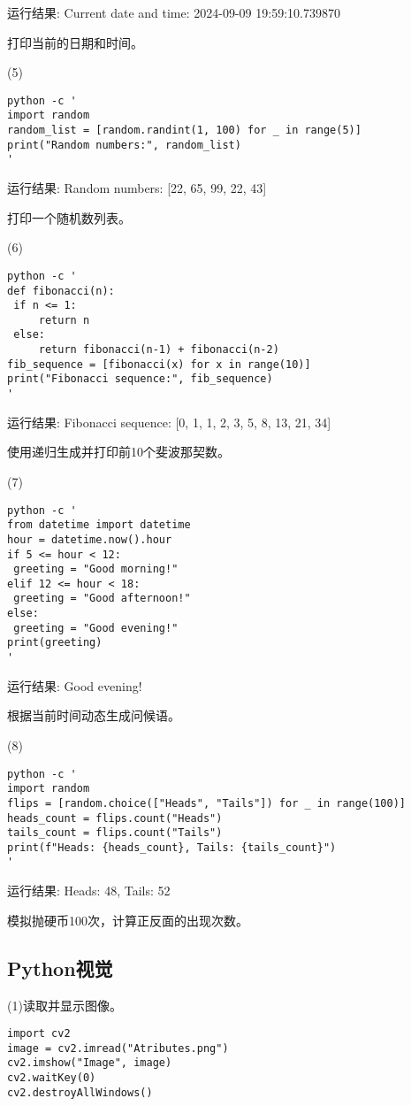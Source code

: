 \documentclass[a4paper, 12pt]{article}
\begin{document}
运行结果:
{\color{blue}
Current date and time: 2024-09-09 19:59:10.739870
}

打印当前的日期和时间。

(5)\begin{verbatim}
python -c '
import random
random_list = [random.randint(1, 100) for _ in range(5)]
print("Random numbers:", random_list)
'
\end{verbatim}

运行结果:
{\color{blue}
Random numbers: [22, 65, 99, 22, 43]
}

打印一个随机数列表。

(6)\begin{verbatim}
python -c '
def fibonacci(n):
 if n <= 1:
     return n
 else:
     return fibonacci(n-1) + fibonacci(n-2)
fib_sequence = [fibonacci(x) for x in range(10)]
print("Fibonacci sequence:", fib_sequence)
'
\end{verbatim}

运行结果:
{\color{blue}
Fibonacci sequence: [0, 1, 1, 2, 3, 5, 8, 13, 21, 34]
}

使用递归生成并打印前10个斐波那契数。

(7)\begin{verbatim}
python -c '
from datetime import datetime
hour = datetime.now().hour
if 5 <= hour < 12:
 greeting = "Good morning!"
elif 12 <= hour < 18:
 greeting = "Good afternoon!"
else:
 greeting = "Good evening!"
print(greeting)
'
\end{verbatim}

运行结果:
{\color{blue}
Good evening!
}

根据当前时间动态生成问候语。

(8)\begin{verbatim}
python -c '
import random
flips = [random.choice(["Heads", "Tails"]) for _ in range(100)]
heads_count = flips.count("Heads")
tails_count = flips.count("Tails")
print(f"Heads: {heads_count}, Tails: {tails_count}")
'
\end{verbatim}

运行结果:
{\color{blue}
Heads: 48, Tails: 52
}

模拟抛硬币100次，计算正反面的出现次数。

\subsection{Python视觉}

(1)读取并显示图像。
\begin{verbatim}
import cv2
image = cv2.imread("Atributes.png")
cv2.imshow("Image", image)
cv2.waitKey(0)
cv2.destroyAllWindows()
\end{verbatim}
\end{document}
